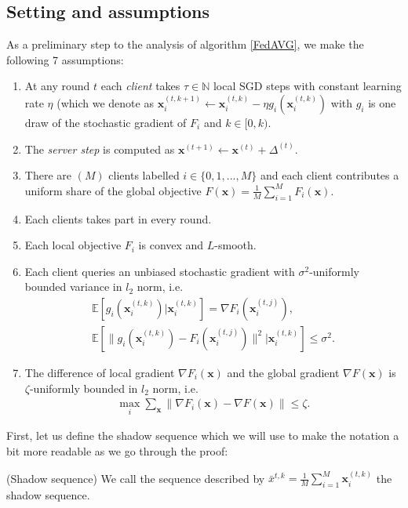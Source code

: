 \subsection{Setting and assumptions}
\label{assumptions}
As a preliminary step to the analysis of algorithm \ref{FedAVG}, we make the following 7 assumptions:

\begin{enumerate}
    \item At any round $t$ each \textit{client} takes $\tau \in \mathbb{N}$ local SGD steps with constant learning rate $\eta$ (which we denote as $\bm{x}_i^{(t,k+1)} \leftarrow \bm{x}_i^{(t,k)} - \eta g_i(\bm{x}_i^{(t,k)})$ with $g_i$ is one draw of the stochastic gradient of $F_i$ and $k \in [0,k)$.
    \item The \textit{server step} is computed as $\bm{x}^{(t+1)} \leftarrow \bm{x}^{(t)} + \Delta^{(t)}$.
    \item There are $(M)$ clients labelled $i \in \{0,1,...,M\}$ and each client contributes a uniform share of the global objective $F(\bm{x}) = \frac{1}{M} \sum^{M}_{i=1} F_i(\bm{x})$.
    \item Each clients takes part in every round.
    \item Each local objective $F_i$ is convex and $L$-smooth.
    \item Each client queries an unbiased stochastic gradient with $\sigma^2$-uniformly bounded variance in $l_2$ norm, i.e.
    \begin{align}
        \mathbb{E}[g_i(\bm{x}^{(t,k)}_i) | \bm{x}^{(t,k)}_i] = \nabla F_i(\bm{x}_i^{(t,j)}), \\
        \mathbb{E}[\| g_i(\bm{x}^{(t,k)}_i) -  F_i(\bm{x}_i^{(t,j)}) \|^2 | \bm{x}_i^{(t,k)} ] \leq \sigma^2.
    \end{align}
    \item The difference of local gradient $\nabla F_i(\bm{x})$ and the global gradient $\nabla F(\bm{x})$ is $\zeta$-uniformly bounded in $l_2$ norm, i.e.
    \begin{align}
        \max_i \sum_{\bm{x}} \| \nabla F_i(\bm{x}) - \nabla F(\bm{x}) \| \leq \zeta.
    \end{align}
\end{enumerate}

First, let us define the shadow sequence which we will use to make the notation a bit more readable as we go through the proof:

\begin{notation}
    (Shadow sequence) We call the sequence described by $\bar{x}^{t,k} = \frac{1}{M} \sum_{i=1}^{M} \bm{x}_i^{(t,k)}$ the shadow sequence.
\end{notation}


